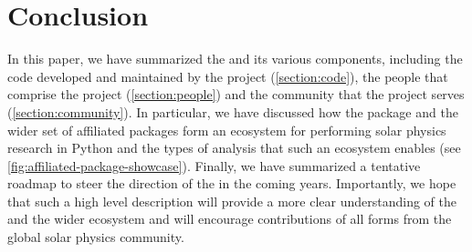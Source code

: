 \section{Conclusion}
\label{section:conclusion}

In this paper, we have summarized the \sunpyproj and its various components, including the code developed and maintained by the project (\autoref{section:code}), the people that comprise the project (\autoref{section:people}) and the community that the project serves (\autoref{section:community}).
In particular, we have discussed how the \sunpypkg package and the wider set of affiliated packages form an ecosystem for performing solar physics research in Python and the types of analysis that such an ecosystem enables (see \autoref{fig:affiliated-package-showcase}).
Finally, we have summarized a tentative roadmap to steer the direction of the \sunpyproj in the coming years.
Importantly, we hope that such a high level description will provide a more clear understanding of the \sunpyproj and the wider ecosystem and will encourage contributions of all forms from the global solar physics community.
